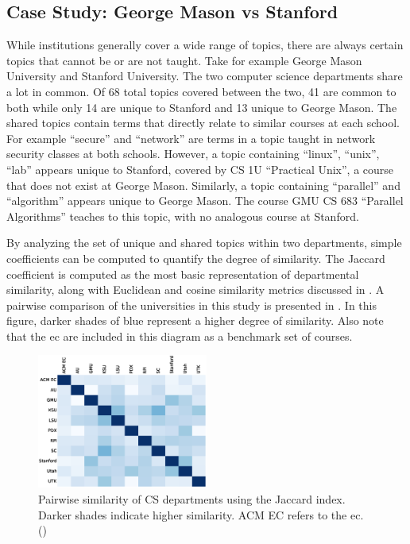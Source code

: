 
\subsection{Case Study: George Mason vs Stanford}
\label{sec:eval-comparison}


While institutions generally cover a wide range of topics, there are always certain topics that cannot be or are not taught.
Take for example George Mason University and Stanford University.
The two computer science departments share a lot in common.
Of 68 total topics covered between the two, 41 are common to both while only 14 are unique to Stanford and 13 unique to George Mason.
The shared topics contain terms that directly relate to similar courses at each school.
For example ``secure'' and ``network'' are terms in a topic taught in network security classes at both schools.
However, a topic containing ``linux'', ``unix'', ``lab'' appears unique to Stanford, covered by CS 1U ``Practical Unix'', a course that does not exist at George Mason.
Similarly, a topic containing ``parallel'' and ``algorithm'' appears unique to George Mason.
The course GMU CS 683 ``Parallel Algorithms'' teaches to this topic, with no analogous course at Stanford.


By analyzing the set of unique and shared topics within two departments, simple coefficients can be computed to quantify the degree of similarity.
The Jaccard coefficient is computed as the most basic representation of departmental similarity, along with Euclidean and cosine similarity metrics discussed in .
A pairwise comparison of the universities in this study is presented in .
In this figure, darker shades of blue represent a higher degree of similarity.
Also note that the \ac{ec} are included in this diagram as a benchmark set of courses.


\begin{figure}
  \includegraphics[width=0.5\textwidth]{figures/10by10heatmap}
  \caption{Pairwise similarity of CS departments using the Jaccard index. Darker shades indicate higher similarity. ACM EC refers to the \acf{ec}. ()\label{fig:heatmap}}
\end{figure}

